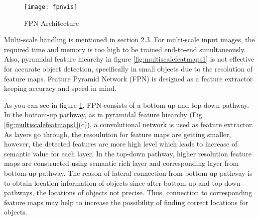 \documentclass{article}
\begin{document}
\setlength{\parindent}{6ex}

\begin{figure}
    \centering
    \texttt{[image: fpnvis]}
    \caption{FPN Architecture}
    \label{fig:fpnvis1}
\end{figure}

\indent

Multi-scale handling is mentioned in section 2.3. For multi-scale input images, 
the required time and memory is too high to be trained end-to-end simultaneously. 
Also, pyramidal feature hiearchy in figure \ref{fig:multiscalefeatmaps1} is not 
effective for accurate object detection, specifically in small objects due to the 
resolution of feature maps. Feature Pyramid Network (FPN) \cite{fpncite} is designed as a 
feature extractor keeping accuracy and speed in mind. \par 

As you can see in figure \ref{fig:fpnvis1}, FPN consists of a bottom-up and 
top-down pathway. In the bottom-up pathway, as in pyramidal feature hiearchy 
(Fig. \ref{fig:multiscalefeatmaps1}(c)), a convolutional network is used as 
feature extractor. As layers go through, the resoulution for feature maps 
are getting smaller, however, the detected features are more high level which 
leads to increase of semantic value for each layer. In the top-down pathway, 
higher resolution feature maps are constructed using semantic rich layer and 
corresponding layer from bottom-up pathway. The reason of lateral 
connection from bottom-up pathway is to obtain location information of 
objects since after bottom-up and top-down pathways, the locations of 
objects not precise. Thus, connection to corresponding feature maps 
may help to increase the possibility of finding correct locations for 
objects. 
\end{document}
